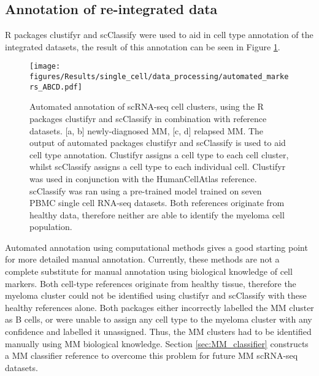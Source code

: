 \subsection{Annotation of re-integrated data}\label{subsec:sc_annotate}
R packages clustifyr and scClassify were used to aid in cell type annotation of the integrated datasets, the result of this annotation can be seen in Figure \ref{fig:annotation_automated}.
\begin{figure}[htb]
    \centering
    \texttt{[image: figures/Results/single\_cell/data\_processing/automated\_markers\_ABCD.pdf]}
    \caption[Automated annotation of scRNA-seq data]{Automated annotation of scRNA-seq cell clusters, using the R packages clustifyr and scClassify in combination with reference datasets.
    [a, b] newly-diagnosed MM, [c, d] relapsed MM.
    The output of automated packages clustifyr and scClassify is used to aid cell type annotation.
    Clustifyr assigns a cell type to each cell cluster, whilst scClassify assigns a cell type to each individual cell.
    Clustifyr was used in conjunction with the HumanCellAtlas reference.
    scClassify was ran using a pre-trained model trained on seven PBMC single cell RNA-seq datasets.
    Both references originate from healthy data, therefore neither are able to identify the myeloma cell population.}
    \label{fig:annotation_automated}
\end{figure}

Automated annotation using computational methods gives a good starting point for more detailed manual annotation.
Currently, these methods are not a complete substitute for manual annotation using biological knowledge of cell markers.
Both cell-type references originate from healthy tissue, therefore the myeloma cluster could not be identified using clustifyr and scClassify with these healthy references alone.
Both packages either incorrectly labelled the MM cluster as B cells, or were unable to assign any cell type to the myeloma cluster with any confidence and labelled it unassigned.
Thus, the MM clusters had to be identified manually using MM biological knowledge.
Section \ref{sec:MM_classifier} constructs a MM classifier reference to overcome this problem for future MM scRNA-seq datasets.

